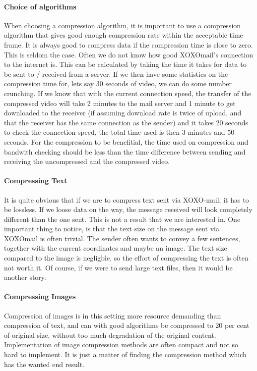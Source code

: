 \paragraph{Choice of algorithms}\hfill
\newline
When choosing a compression algorithm, it is important to use a compression algorithm that gives good enough compression rate within the acceptable time frame. It is always good to compress data if the compression time is close to zero. This is seldom the case.
\newline
\newline
Often we do not know how good XOXOmail's connection to the internet is. This can be calculated by taking the time it takes for data to be sent to / received from a server. If we then have some statistics on the compression time for, lets say 30 seconds of video, we can do some number crunching. If we know that with the current connection speed, the transfer of the compressed video will take 2 minutes to the mail server and 1 minute to get downloaded to the receiver (if assuming download rate is twice of upload, and that the receiver has the same connection as the sender) and it takes 20 seconds to check the connection speed, the total time used is then 3 minutes and 50 seconds. For the compression to be benefitial, the time used on compression and bandwith checking should be less than the time difference between sending and receiving the uncompressed and the compressed video.

\paragraph{Compressing Text} \hfill
\newline
It is quite obvious that if we are to compress text sent via XOXO-mail, it has to be lossless. If we loose data on the way, the message received will look completely different than the one sent. This is not a result that we are interested in. One important thing to notice, is that the text size on the message sent via XOXOmail is often trivial. The sender often wants to convey a few sentences, together with the current coordinates and maybe an image. The text size compared to the image is negligble, so the effort of compressing the text is often not worth it. Of course, if we were to send large text files, then it would be another story.

\paragraph{Compressing Images} \hfill
\newline
Compression of images is in this setting more resource demanding than compression of text, and can with good algorithms be compressed to 20 per cent of original size, without too much degradation of the original content. Implementation of image compression methods are often compact and not so hard to implement. It is just a matter of finding the compression method which has the wanted end result.

